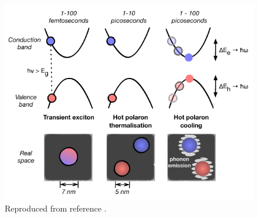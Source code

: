 \begin{figure}[h!]
\centering
  \includegraphics[width=0.7\columnwidth]{figures/ch5/f1.pdf}
  \caption{Reproduced from reference \cite{Whalley2017a}.}
\label{cooling_schematic}
\end{figure}

